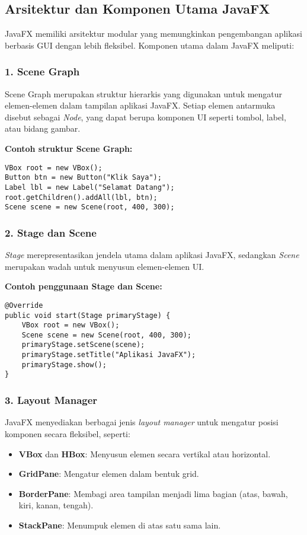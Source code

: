 \subsection{Arsitektur dan Komponen Utama JavaFX}

JavaFX memiliki arsitektur modular yang memungkinkan pengembangan aplikasi berbasis GUI dengan lebih fleksibel. Komponen utama dalam JavaFX meliputi:

\subsubsection{1. Scene Graph}
Scene Graph merupakan struktur hierarkis yang digunakan untuk mengatur elemen-elemen dalam tampilan aplikasi JavaFX. Setiap elemen antarmuka disebut sebagai \textit{Node}, yang dapat berupa komponen UI seperti tombol, label, atau bidang gambar.

\textbf{Contoh struktur Scene Graph:}
\begin{lstlisting}[style=JavaStyle, caption=Contoh penggunaan Scene Graph dalam JavaFX]
VBox root = new VBox();
Button btn = new Button("Klik Saya");
Label lbl = new Label("Selamat Datang");
root.getChildren().addAll(lbl, btn);
Scene scene = new Scene(root, 400, 300);
\end{lstlisting}

\subsubsection{2. Stage dan Scene}
\textit{Stage} merepresentasikan jendela utama dalam aplikasi JavaFX, sedangkan \textit{Scene} merupakan wadah untuk menyusun elemen-elemen UI.

\textbf{Contoh penggunaan Stage dan Scene:}
\begin{lstlisting}[style=JavaStyle, caption=Contoh implementasi Stage dan Scene]
@Override
public void start(Stage primaryStage) {
	VBox root = new VBox();
	Scene scene = new Scene(root, 400, 300);
	primaryStage.setScene(scene);
	primaryStage.setTitle("Aplikasi JavaFX");
	primaryStage.show();
}
\end{lstlisting}

\subsubsection{3. Layout Manager}
JavaFX menyediakan berbagai jenis \textit{layout manager} untuk mengatur posisi komponen secara fleksibel, seperti:
\begin{itemize}
\item \textbf{VBox} dan \textbf{HBox}: Menyusun elemen secara vertikal atau horizontal.
\item \textbf{GridPane}: Mengatur elemen dalam bentuk grid.
\item \textbf{BorderPane}: Membagi area tampilan menjadi lima bagian (atas, bawah, kiri, kanan, tengah).
\item \textbf{StackPane}: Menumpuk elemen di atas satu sama lain.
\end{itemize}

